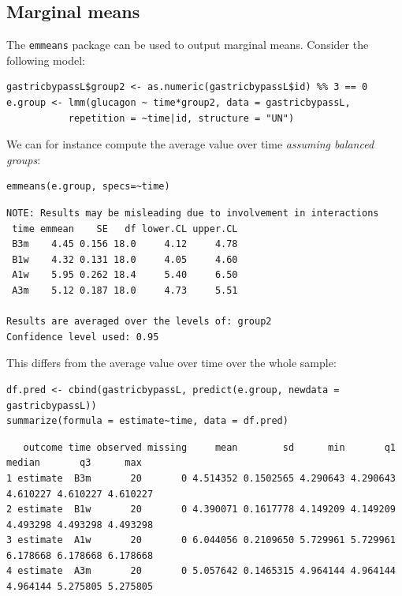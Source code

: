 \documentclass[12pt]{article}
\begin{document}
\subsection{Marginal means}
\label{sec:orga117d60}

The \texttt{emmeans} package can be used to output marginal means. Consider
the following model:
\lstset{language=r,label= ,caption= ,captionpos=b,numbers=none}
\begin{lstlisting}
gastricbypassL$group2 <- as.numeric(gastricbypassL$id) %% 3 == 0
e.group <- lmm(glucagon ~ time*group2, data = gastricbypassL,
	       repetition = ~time|id, structure = "UN")
\end{lstlisting}

We can for instance compute the average value over time \emph{assuming balanced groups}:
\lstset{language=r,label= ,caption= ,captionpos=b,numbers=none}
\begin{lstlisting}
emmeans(e.group, specs=~time)
\end{lstlisting}

\begin{verbatim}
NOTE: Results may be misleading due to involvement in interactions
 time emmean    SE   df lower.CL upper.CL
 B3m    4.45 0.156 18.0     4.12     4.78
 B1w    4.32 0.131 18.0     4.05     4.60
 A1w    5.95 0.262 18.4     5.40     6.50
 A3m    5.12 0.187 18.0     4.73     5.51

Results are averaged over the levels of: group2 
Confidence level used: 0.95
\end{verbatim}


This differs from the average value over time over the whole sample:
\lstset{language=r,label= ,caption= ,captionpos=b,numbers=none}
\begin{lstlisting}
df.pred <- cbind(gastricbypassL, predict(e.group, newdata = gastricbypassL))
summarize(formula = estimate~time, data = df.pred)
\end{lstlisting}

\begin{verbatim}
   outcome time observed missing     mean        sd      min       q1   median       q3      max
1 estimate  B3m       20       0 4.514352 0.1502565 4.290643 4.290643 4.610227 4.610227 4.610227
2 estimate  B1w       20       0 4.390071 0.1617778 4.149209 4.149209 4.493298 4.493298 4.493298
3 estimate  A1w       20       0 6.044056 0.2109650 5.729961 5.729961 6.178668 6.178668 6.178668
4 estimate  A3m       20       0 5.057642 0.1465315 4.964144 4.964144 4.964144 5.275805 5.275805
\end{verbatim}
\end{document}
